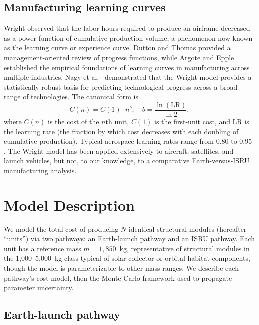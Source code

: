 \documentclass[preprint,12pt]{elsarticle}
\begin{document}
\subsection{Manufacturing learning curves}

Wright \cite{wright1936} observed that the labor hours required to produce an airframe decreased as a power function of cumulative production volume, a phenomenon now known as the learning curve or experience curve. Dutton and Thomas \cite{dutton1984} provided a management-oriented review of progress functions, while Argote and Epple \cite{argote1990} established the empirical foundations of learning curves in manufacturing across multiple industries. Nagy et al.\ \cite{nagy2013} demonstrated that the Wright model provides a statistically robust basis for predicting technological progress across a broad range of technologies. The canonical form is
\begin{equation}
  C(n) = C(1) \cdot n^{b}, \quad b = \frac{\ln(\text{LR})}{\ln 2},
  \label{eq:wright}
\end{equation}
where $C(n)$ is the cost of the $n$th unit, $C(1)$ is the first-unit cost, and LR is the learning rate (the fraction by which cost decreases with each doubling of cumulative production). Typical aerospace learning rates range from 0.80 to 0.95 \cite{wertz2011}. The Wright model has been applied extensively to aircraft, satellites, and launch vehicles, but not, to our knowledge, to a comparative Earth-versus-ISRU manufacturing analysis.

\section{Model Description}
\label{sec:model}

We model the total cost of producing $N$ identical structural modules (hereafter ``units'') via two pathways: an Earth-launch pathway and an ISRU pathway. Each unit has a reference mass $m = 1{,}850$~kg, representative of structural modules in the 1{,}000--5{,}000~kg class typical of solar collector or orbital habitat components, though the model is parameterizable to other mass ranges. We describe each pathway's cost model, then the Monte Carlo framework used to propagate parameter uncertainty.

\subsection{Earth-launch pathway}
\end{document}
